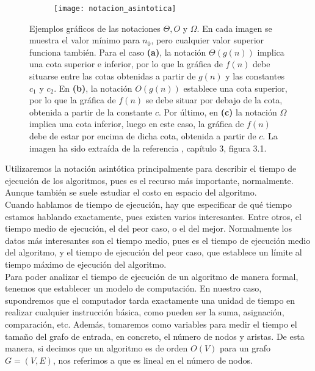 \begin{figure}[!htb]
	\centering
	\begin{subfigure}{\linewidth}
		\texttt{[image: notacion\_asintotica]}
	\end{subfigure}
	
	\caption{Ejemplos gráficos de las notaciones $\Theta,O$ y $\Omega$. En cada imagen se muestra el valor mínimo para $n_0$, pero cualquier valor superior funciona también. Para el caso \textbf{(a)}, la notación $\Theta(g(n))$ implica una cota superior e inferior, por lo que la gráfica de $f(n)$ debe situarse entre las cotas obtenidas a partir de $g(n)$ y las constantes $c_1$ y $c_2$. En \textbf{(b)}, la notación $O(g(n))$ establece una cota superior, por lo que la gráfica de $f(n)$ se debe situar por debajo de la cota, obtenida a partir de la constante $c$. Por último, en \textbf{(c)} la notación $\Omega$ implica una cota inferior, luego en este caso, la gráfica de $f(n)$ debe de estar por encima de dicha cota, obtenida a partir de $c$. La imagen ha sido extraída de la referencia \cite{algorithms}, capítulo 3, figura 3.1.}
	\label{fig:notacion_asintotica}
\end{figure}

Utilizaremos la notación asintótica principalmente para describir el tiempo de ejecución de los algoritmos, pues es el recurso más importante, normalmente. Aunque también se suele estudiar el costo en espacio del algoritmo. \\

Cuando hablamos de tiempo de ejecución, hay que especificar de qué tiempo estamos hablando exactamente, pues existen varios interesantes. Entre otros, el tiempo medio de ejecución, el del peor caso, o el del mejor. Normalmente los datos más interesantes son el tiempo medio, pues es el tiempo de ejecución medio del algoritmo, y el tiempo de ejecución del peor caso, que establece un límite al tiempo máximo de ejecución del algoritmo. \\

Para poder analizar el tiempo de ejecución de un algoritmo de manera formal, tenemos que establecer un modelo de computación. En nuestro caso, supondremos que el computador tarda exactamente una unidad de tiempo en realizar cualquier instrucción básica, como pueden ser la suma, asignación, comparación, etc. Además, tomaremos como variables para medir el tiempo el tamaño del grafo de entrada, en concreto, el número de nodos y aristas. De esta manera, si decimos que un algoritmo es de orden $O(V)$ para un grafo $G=(V,E)$, nos referimos a que es lineal en el número de nodos. \\

